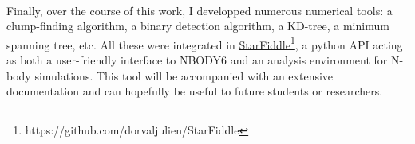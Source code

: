 \paragraph*{}
Finally, over the course of this work, I developped numerous numerical tools: a clump-finding algorithm, a binary detection algorithm, a KD-tree, a minimum spanning tree, etc. All these were integrated in \href{https://github.com/dorvaljulien/StarFiddle}{StarFiddle}\footnote{https://github.com/dorvaljulien/StarFiddle}, a python API acting as both a user-friendly interface to NBODY6 and an analysis environment for N-body simulations. This tool will be accompanied with an extensive documentation and can hopefully be useful to future students or researchers.






%
%
%
%
%
%
%

